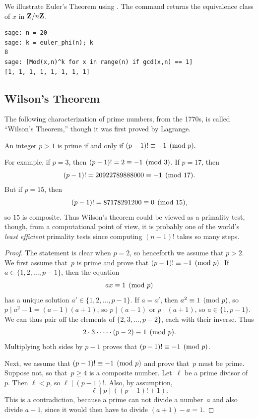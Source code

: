 \begin{sg}
We illustrate Euler's Theorem using \sage.
The  command  returns the equivalence
class of $x$ in $\mathbf{Z}/n\mathbf{Z}$.
\begin{verbatim}
sage: n = 20
sage: k = euler_phi(n); k
8
sage: [Mod(x,n)^k for x in range(n) if gcd(x,n) == 1]
[1, 1, 1, 1, 1, 1, 1, 1]
\end{verbatim}
\end{sg}


\subsection{Wilson's Theorem}
The following characterization of prime numbers, from the 1770s, is
called ``Wilson's Theorem,'' though it was first proved by
Lagrange.
\begin{proposition}\label{prop:wilson}
An integer $p>1$ is prime if and only if
$(p-1)! \equiv -1 \pmod{p}.$
\end{proposition}
For example,
if $p=3$, then $(p-1)! = 2\equiv -1\pmod{3}$.
If $p=17$, then
$$(p-1)! = 20922789888000 \equiv -1\pmod{17}.$$
But if $p=15$, then
$$(p-1)! = 87178291200 \equiv 0 \pmod{15},$$
so $15$ is composite.  Thus Wilson's theorem could be viewed
as a primality test, though, from a computational point of view,
it is probably one of the world's {\em least efficient}
primality tests since computing $(n-1)!$ takes so many steps.
\begin{proof}
The statement is clear when $p=2$, so henceforth we assume
that $p>2$.
We first assume that~$p$ is prime and prove that
$(p-1)! \equiv -1\pmod{p}$.  If $a\in\{1,2,\ldots,p-1\}$, then
the equation
$$
  ax\equiv 1\pmod{p}
$$
has a unique solution $a'\in\{1,2,\ldots,p-1\}$.
If $a=a'$, then $a^2\equiv 1\pmod{p}$, so
$p\mid a^2-1 = (a-1)(a+1)$, so
$p\mid (a-1)$ or $p\mid (a+1)$, so $a\in\{1,p-1\}$.
We can thus pair off the elements of
$\{2,3,\ldots,p-2\}$,
each with their inverse.
Thus
$$
  2\cdot 3 \cdot \cdots \cdot (p-2) \equiv 1\pmod{p}.
$$
Multiplying both sides by $p-1$ proves that
$(p-1)! \equiv -1\pmod{p}$.

Next, we assume that $(p-1)! \equiv -1\pmod{p}$ and
prove that~$p$ must be prime.  Suppose not, so that~$p\geq 4$
is a composite number.  Let~$\ell$ be a prime divisor
of~$p$.  Then $\ell<p$, so $\ell\mid (p-1)!$.  Also,
by assumption,
$$
  \ell \mid p \mid ((p-1)! + 1).
$$
This is a contradiction, because a prime can not divide a number~$a$ and
also divide $a+1$, since it would then have to divide $(a+1) - a=1$.
\end{proof}

